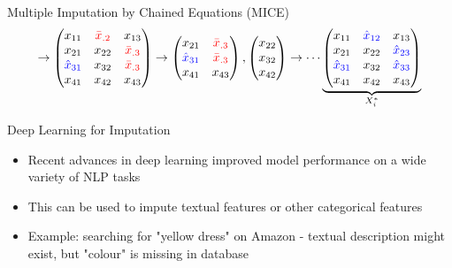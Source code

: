 \documentclass[aspectratio=43]{beamer}
\begin{document}
\begin{frame}{Multiple Imputation by Chained Equations (MICE)}
$$
\rightarrow
\begin{pmatrix}
x_{11} 		& \textcolor{red}{\bar{x}_{.2}} 	& x_{13} \\
x_{21} 		& x_{22} 		& \textcolor{red}{\bar{x}_{.3}} \\
\textcolor{blue}{\hat{x}_{31}} & x_{32} 	& \textcolor{red}{\bar{x}_{.3}} \\
x_{41} 		& x_{42} 	& x_{43} \\
\end{pmatrix}
\rightarrow
\begin{pmatrix}
x_{21} 		& \textcolor{red}{\bar{x}_{.3}} \\
\textcolor{blue}{\hat{x}_{31}} & \textcolor{red}{\bar{x}_{.3}} \\
x_{41} 		& x_{43} \\
\end{pmatrix},
\begin{pmatrix}
x_{22} \\
x_{32} \\
x_{42} \\
\end{pmatrix}
\rightarrow
\cdots
\underbrace{\begin{pmatrix}
x_{11} 		& \textcolor{blue}{\hat{x}_{12}} 	& x_{13} \\
x_{21} 		& x_{22} 		& \textcolor{blue}{\hat{x}_{23}} \\
\textcolor{blue}{\hat{x}_{31}} & x_{32} 	& \textcolor{blue}{\hat{x}_{33}} \\
x_{41} 		& x_{42} 	& x_{43} \\
\end{pmatrix}}_{X_i^{*}}
$$
\end{frame}

\begin{frame}{Deep Learning for Imputation}
\begin{itemize}
	\item Recent advances in deep learning improved model performance on a wide variety of NLP tasks
	\item This can be used to impute textual features or other categorical features
	\item Example: searching for "yellow dress" on Amazon - textual description might exist, but "colour" is missing in database
\end{itemize}
\end{frame}
\end{document}
